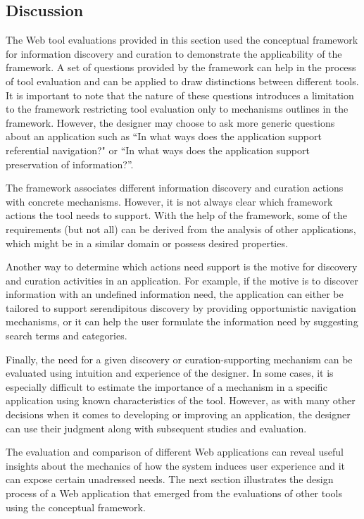 \documentclass{sigchi}
\begin{document}
{{} %

{\subsection{Discussion}
The Web tool evaluations provided in this section used the conceptual framework for information discovery and curation to demonstrate the applicability of the framework. A set of questions provided by the framework can help in the process of tool evaluation and can be applied to draw distinctions between different tools. It is important to note that the nature of these questions introduces a limitation to the framework restricting tool evaluation only to mechanisms outlines in the framework. However, the designer  may choose to ask more generic questions about an application such as ``In what ways does the application support referential navigation?" or ``In what ways does the application support preservation of information?''.

The framework associates different information discovery and curation actions with concrete mechanisms. However, it is not always clear which framework actions the tool needs to support. With the help of the framework, some of the requirements (but not all) can be derived from the analysis of other applications, which might be in a similar domain or possess desired properties. 

Another way to determine which actions need support is the motive for discovery and curation activities in an application. For example, if the motive is to discover information with an undefined information need, the application  can either be tailored to support serendipitous discovery by providing opportunistic navigation mechanisms, or it can help the user formulate the information need by suggesting search terms and categories.

Finally, the need for a given discovery or curation-supporting mechanism can be evaluated using intuition and experience of the designer. In some cases, it is especially difficult to estimate the importance of a mechanism in a specific application using known characteristics of the tool. However, as with many other decisions when it comes to developing or improving an application, the designer can use their judgment along with subsequent studies and evaluation. 

The evaluation and comparison of different Web applications can reveal useful insights about the mechanics of how the system induces user experience and it can expose certain unadressed needs. The next section illustrates the design process of a Web application that emerged from the evaluations of other tools using the conceptual framework. 

}}
\end{document}
